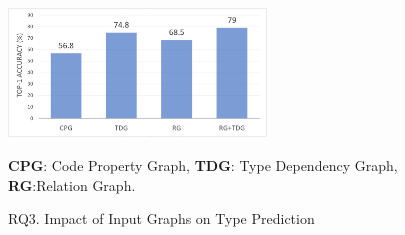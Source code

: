 \begin{figure}[t]%
\begin{center}
\includegraphics[width=2.7in]{figures/sensi-graphs-type-2}
\vspace{-8pt}
\caption{RQ3. Impact of Input Graphs on Type Prediction}
\label{graph-type-result}
{\bf CPG}: Code Property Graph, {\bf TDG}: Type Dependency Graph, {\bf RG}:Relation Graph.
\end{center}
\end{figure}



